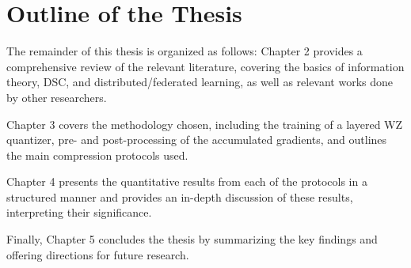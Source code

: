 \section{Outline of the Thesis}

The remainder of this thesis is organized as follows: Chapter 2 provides a comprehensive review of the relevant literature, covering the basics of information theory, DSC, and distributed/federated learning, as well as relevant works done by other researchers.

Chapter 3 covers the methodology chosen, including the training of a layered WZ quantizer, pre- and post-processing of the accumulated gradients, and outlines the main compression protocols used.

Chapter 4 presents the quantitative results from each of the protocols in a structured manner and provides an in-depth discussion of these results, interpreting their significance.

Finally, Chapter 5 concludes the thesis by summarizing the key findings and offering directions for future research.
